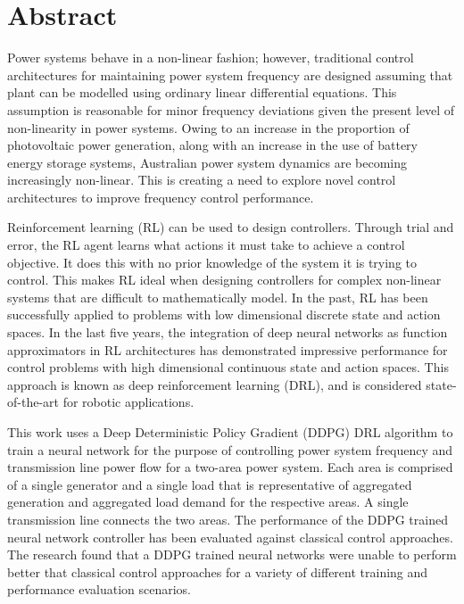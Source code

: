 \chapter*{Abstract} %
Power systems behave in a non-linear fashion; however, traditional control architectures for maintaining power system frequency are designed assuming that plant can be modelled using ordinary linear differential equations. This assumption is reasonable for minor frequency deviations given the present level of non-linearity in power systems. Owing to an increase in the proportion of photovoltaic power generation, along with an increase in the use of battery energy storage systems, Australian power system dynamics are becoming increasingly non-linear. This is creating a need to explore novel control architectures to improve frequency control performance.

Reinforcement learning (RL) can be used to design controllers. Through trial and error, the RL agent learns what actions it must take to achieve a control objective. It does this with no prior knowledge of the system it is trying to control. This makes RL ideal when designing controllers for complex non-linear systems that are difficult to mathematically model. In the past, RL has been successfully applied to problems with low dimensional discrete state and action spaces. In the last five years, the integration of deep neural networks as function approximators in RL architectures has demonstrated impressive performance for control problems with high dimensional continuous state and action spaces. This approach is known as deep reinforcement learning (DRL), and is considered state-of-the-art for robotic applications.

This work uses a Deep Deterministic Policy Gradient (DDPG) DRL algorithm to train a neural network for the purpose of controlling power system frequency and transmission line power flow for a two-area power system. Each area is comprised of a single generator and a single load that is representative of aggregated generation and aggregated load demand for the respective areas. A single transmission line connects the two areas. The performance of the DDPG trained neural network controller has been evaluated against classical control approaches. The research found that a DDPG trained neural networks were unable to perform better that classical control approaches for a variety of different training and performance evaluation scenarios.